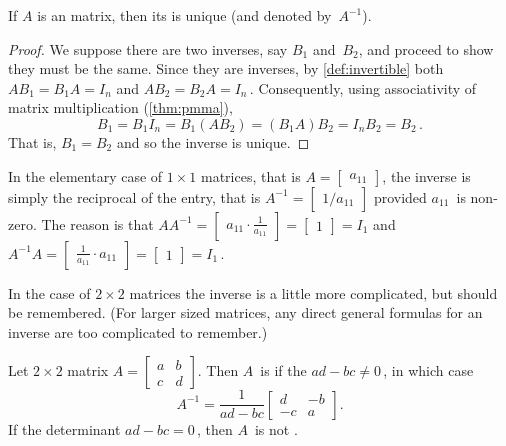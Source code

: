\begin{theorem} \label{thm:uninv} 
If \(A\) is an  matrix, then its  is unique (and denoted by~\(A^{-1}\)).
\end{theorem}
\begin{proof} 
We suppose there are two inverses, say \(B_1\) and~\(B_2\), and proceed to show they must be the same.
Since they are inverses, by \autoref{def:invertible} both
\(AB_1=B_1A=I_n\) and \(AB_2=B_2A=I_n\)\,.
Consequently, using associativity of matrix multiplication (\autoref{thm:pmma}),
\begin{equation*}
B_1=B_1I_n=B_1(AB_2)=(B_1A)B_2=I_nB_2=B_2\,.
\end{equation*}
That is, \(B_1=B_2\) and so the inverse is unique.
\end{proof}



In the elementary case of \(1\times1\) matrices, that is \(A=\begin{bmatrix} a_{11} \end{bmatrix}\), the inverse is simply the reciprocal of the entry, that is \(A^{-1}=\begin{bmatrix} 1/a_{11} \end{bmatrix}\) provided \(a_{11}\)~is non-zero.
The reason is that \(AA^{-1}=\begin{bmatrix} a_{11}\cdot\frac1{a_{11}} \end{bmatrix}=\begin{bmatrix} 1 \end{bmatrix}=I_1\) and  \(A^{-1}A=\begin{bmatrix} \frac1{a_{11}}\cdot a_{11} \end{bmatrix}=\begin{bmatrix} 1 \end{bmatrix}=I_1\)\,.

In the case of \(2\times2\) matrices the inverse is a little more complicated, but should be remembered.
(For larger sized matrices, any direct general formulas for an inverse are too complicated to remember.)

\begin{theorem} \label{thm:2x2det} 
Let \(2\times2\) matrix \(A=\begin{bmatrix} a&b\\c&d \end{bmatrix}\). Then \(A\)~is  if the  \(ad-bc\neq0\)\,, in which case
\begin{equation}
A^{-1}=\frac1{ad-bc}\begin{bmatrix} d&-b\\-c&a \end{bmatrix}.
\label{eq:2x2inv}
\end{equation}
If the determinant \(ad-bc=0\)\,, then \(A\)~is not .
\end{theorem}

